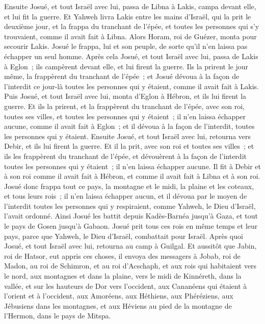 \begin{multicols}{2}
Ensuite Josué, et tout Israël avec lui, passa de Libna à Lakis, campa devant elle, et lui fit la guerre.
Et Yahweh livra Lakis entre les mains d'Israël, qui la prit le deuxième jour, et la frappa du tranchant de l'épée, et toutes les personnes qui s'y trouvaient, comme il avait fait à Libna.
Alors Horam, roi de Guézer, monta pour secourir Lakis. Josué le frappa, lui et son peuple, de sorte qu'il n'en laissa pas échapper un seul homme.
Après cela Josué, et tout Israël avec lui, passa de Lakis à Eglon~; ils campèrent devant elle, et lui firent la guerre.
Ils la prirent le jour même, la frappèrent du tranchant de l'épée~; et Josué dévoua à la façon de l'interdit ce jour-là toutes les personnes qui y étaient, comme il avait fait à Lakis.
Puis Josué, et tout Israël avec lui, monta d'Eglon à Hébron, et ils lui firent la guerre.
Et ils la prirent, et la frappèrent du tranchant de l'épée, avec son roi, toutes ses villes, et toutes les personnes qui y étaient~; il n'en laissa échapper aucune, comme il avait fait à Eglon~; et il dévoua à la façon de l'interdit, toutes les personnes qui y étaient.
Ensuite Josué, et tout Israël avec lui, retourna vers Debir, et ils lui firent la guerre.
Et il la prit, avec son roi et toutes ses villes~; et ils les frappèrent du tranchant de l'épée, et dévouèrent à la façon de l'interdit toutes les personnes qui y étaient~; il n'en laissa échapper aucune. Il fit à Debir et à son roi comme il avait fait à Hébron, et comme il avait fait à Libna et à son roi.
Josué donc frappa tout ce pays, la montagne et le midi, la plaine et les coteaux, et tous leurs rois~; il n'en laissa échapper aucun, et il dévoua par le moyen de l'interdit toutes les personnes qui y respiraient, comme Yahweh, le Dieu d'Israël, l'avait ordonné.
Ainsi Josué les battit depuis Kadès-Barnéa jusqu'à Gaza, et tout le pays de Gosen jusqu'à Gabaon.
Josué prit tous ces rois en même temps et leur pays, parce que Yahweh, le Dieu d'Israël, combattait pour Israël.
Après quoi Josué, et tout Israël avec lui, retourna au camp à Guilgal.
\VerseOne{}Et aussitôt que Jabin, roi de Hatsor, eut appris ces choses, il envoya des messagers à Jobab, roi de Madon, au roi de Schimron, et au roi d'Acschaph,
et aux rois qui habitaient vers le nord, aux montagnes et dans la plaine, vers le midi de Kinnéreth, dans la vallée, et sur les hauteurs de Dor vers l'occident,
aux Cananéens qui étaient à l'orient et à l'occident, aux Amoréens, aux Héthiens, aux Phéréziens, aux Jébusiens dans les montagnes, et aux Héviens au pied de la montagne de l'Hermon, dans le pays de Mitspa.

\end{multicols}
